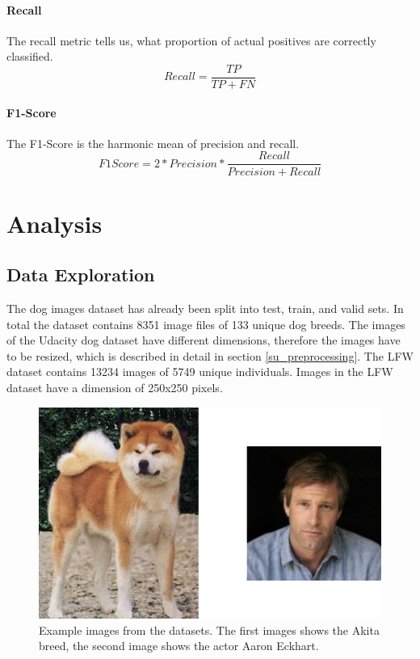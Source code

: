 \documentclass{article}
\begin{document}
\paragraph{Recall} The recall metric tells us, what proportion of actual positives are correctly classified.
\begin{equation}
Recall = \frac{TP}{TP + FN}
\end{equation}

\paragraph{F1-Score} The F1-Score is the harmonic mean of precision and recall.
\begin{equation}
F1 Score = 2 * Precision * \frac{Recall}{Precision + Recall}
\end{equation}

\section{Analysis} \label{s_analysis}

\subsection{Data Exploration} \label{su_data_expl}
The dog images dataset has already been split into test, train, and valid sets. In total the dataset contains 8351 image files of 133 unique dog breeds. The images of the Udacity dog dataset have different dimensions, therefore the images have to be resized, which is described in detail in section \ref{su_preprocessing}. The LFW dataset contains 13234 images of 5749 unique individuals. Images in the LFW dataset have a dimension of 250x250 pixels.\newpage

\begin{figure}[h]
    \centering
    \includegraphics[scale=0.35]{./images/dataset_example}
    \caption{Example images from the datasets. The first images shows the Akita breed, the second image shows the actor Aaron Eckhart.}
    \label{fig:dataset_example}
\end{figure}
\newpage
\end{document}
